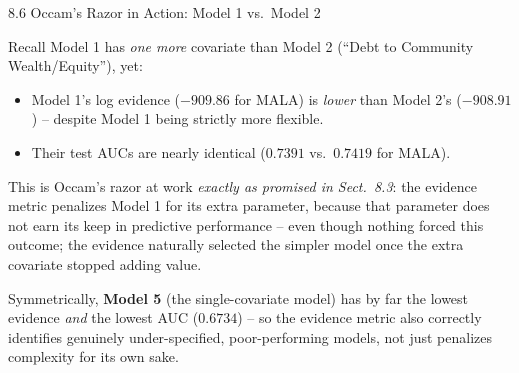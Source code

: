\documentclass[aspectratio=169,10pt]{beamer}
\begin{document}
\begin{frame}[allowframebreaks]{8.6 Occam's Razor in Action: Model 1 vs.\ Model 2}

Recall Model 1 has \emph{one more} covariate than Model 2 (``Debt to Community Wealth/Equity''), yet:
\begin{itemize}
  \item Model 1's log evidence ($-909.86$ for MALA) is \emph{lower} than Model 2's ($-908.91$) -- despite Model 1 being strictly more flexible.
  \item Their test AUCs are nearly identical ($0.7391$ vs.\ $0.7419$ for MALA).
\end{itemize}
This is Occam's razor at work \emph{exactly as promised in Sect.\ 8.3}: the evidence metric penalizes Model 1 for its extra parameter, because that parameter does not earn its keep in predictive performance -- even though nothing forced this outcome; the evidence naturally selected the simpler model once the extra covariate stopped adding value.

\vspace{0.2cm}
Symmetrically, \textbf{Model 5} (the single-covariate model) has by far the lowest evidence \emph{and} the lowest AUC ($0.6734$) -- so the evidence metric also correctly identifies genuinely under-specified, poor-performing models, not just penalizes complexity for its own sake.

\end{frame}
\end{document}
